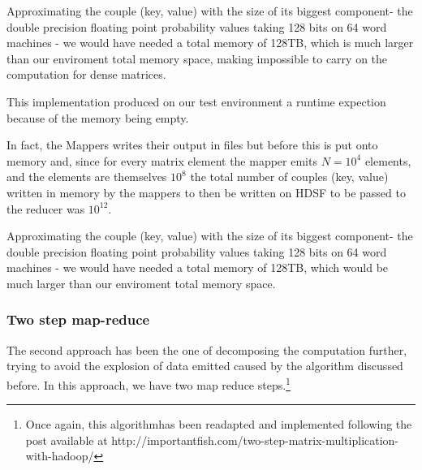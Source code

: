 Approximating the couple (key, value) with the size of its biggest component-
the double precision floating point probability values taking 128 bits on 64 word
machines - we would have needed a total memory of 128TB, which is much larger than
our enviroment total memory space, making impossible to carry on the computation
for dense matrices.


This implementation produced on our test environment a runtime expection
because of the memory being empty.

In fact, the Mappers writes their output in files but before this is put onto memory
and, since for every matrix element the mapper emits $N=10^4$ elements, and the elements
are themselves $10^8$ the total number of couples (key, value) written in memory
by the mappers to then be written on HDSF to be passed to the reducer was $10^{12}$.

Approximating the couple (key, value) with the size of its biggest component-
the double precision floating point probability values taking 128 bits on 64 word
machines - we would have needed a total memory of 128TB, which would be much larger than
our enviroment total memory space.

\subsubsection{Two step map-reduce}
The second approach has been the one of decomposing the computation further, trying to avoid
the explosion of data emitted caused by the algorithm discussed before.
In this approach, we have two map reduce steps.\footnote{Once again, this algorithmhas been readapted and implemented
following the post available at http://importantfish.com/two-step-matrix-multiplication-with-hadoop/}

